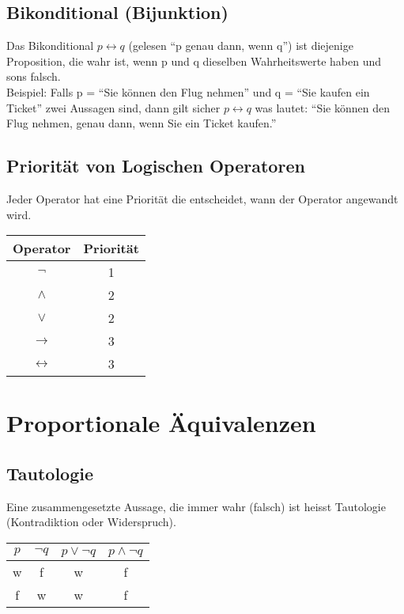 \documentclass[12pt,a4paper]{article}
\begin{document}
\subsection{Bikonditional (Bijunktion)}Das Bikonditional $p \leftrightarrow q$ (gelesen "`p genau dann, wenn q"') ist diejenige Proposition, die wahr ist, wenn p und q dieselben Wahrheitswerte haben und sons falsch.\\
Beispiel: Falls p = "`Sie können den Flug nehmen"' und q = "`Sie kaufen ein Ticket"' zwei Aussagen sind, dann gilt sicher $p \leftrightarrow q$ was lautet: "`Sie können den Flug nehmen, genau dann, wenn Sie ein Ticket kaufen."'

\subsection{Priorität von Logischen Operatoren}Jeder Operator hat eine Priorität die entscheidet, wann der Operator angewandt wird.\\
\begin{tabular}{|c|c|}
    \hline
        Operator&Priorität\\
        \hline
        $\neg$ &1\\
        \hline
        $\wedge$ &2\\
        $\vee$ &2\\
        \hline
        $\rightarrow$ &3\\
        $\leftrightarrow$ &3\\
    \hline
\end{tabular}

\section{Proportionale Äquivalenzen}

\subsection{Tautologie}Eine zusammengesetzte Aussage, die immer wahr (falsch) ist heisst Tautologie (Kontradiktion oder Widerspruch).\\
\begin{tabular}{|c|c|c|c|}
    \hline
        $p$&$\neg q$&$p \vee \neg q$&$p \wedge \neg q$\\
        \hline
        w&f&w&f\\
        f&w&w&f\\
    \hline
\end{tabular}
\end{document}
